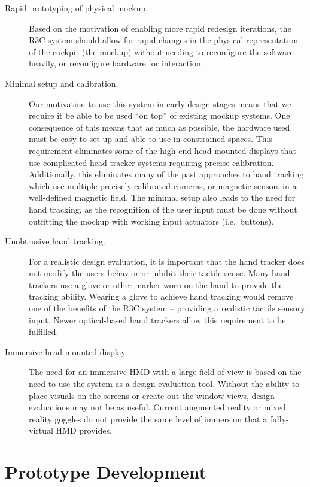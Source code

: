 \begin{description}
    \item [Rapid prototyping of physical mockup.]
        Based on the motivation of enabling more rapid redesign iterations, the R3C system should allow for rapid changes in the physical representation of the cockpit (the mockup) without needing to reconfigure the software heavily, or reconfigure hardware for interaction.
    \item [Minimal setup and calibration.]
        Our motivation to use this system in early design stages means that we require it be able to be used ``on top'' of existing mockup systems.
        One consequence of this means that as much as possible, the hardware used must be easy to set up and able to use in constrained spaces.
        This requirement eliminates some of the high-end head-mounted displays that use complicated head tracker systems requiring precise calibration.
        Additionally, this eliminates many of the past approaches to hand tracking which use multiple precisely calibrated cameras, or magnetic sensors in a well-defined magnetic field.
        The minimal setup also leads to the need for hand tracking, as the recognition of the user input must be done without outfitting the mockup with working input actuators (i.e.\ buttons).
    \item [Unobtrusive hand tracking.]
        For a realistic design evaluation, it is important that the hand tracker does not modify the users behavior or inhibit their tactile sense.
        Many hand trackers use a glove or other marker worn on the hand to provide the tracking ability.
        Wearing a glove to achieve hand tracking would remove one of the benefits of the R3C system -- providing a realistic tactile sensory input.
        Newer optical-based hand trackers allow this requirement to be fulfilled.
    \item [Immersive head-mounted display.]
        The need for an immersive HMD with a large field of view is based on the need to use the system as a design evaluation tool.
        Without the ability to place visuals on the screens or create out-the-window views, design evaluations may not be as useful.
        Current augmented reality or mixed reality goggles do not provide the same level of immersion that a fully-virtual HMD provides.
\end{description}

\section{Prototype Development}

